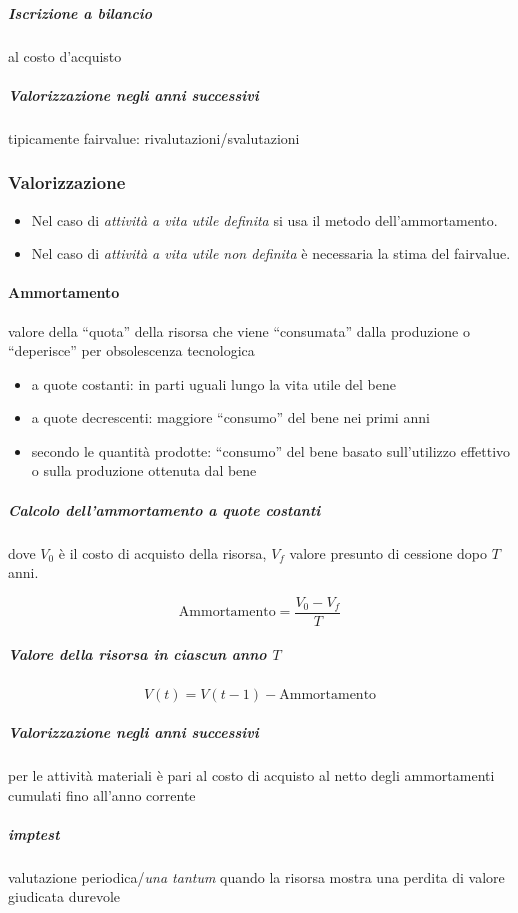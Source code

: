 \documentclass[10pt,a4paper,fleqn,oneside]{book}
\begin{document}
\subparagraph{Iscrizione a bilancio} al costo d'acquisto
\subparagraph{Valorizzazione negli anni successivi} tipicamente \gls{fairvalue}:
rivalutazioni/svalutazioni

\subsubsection{Valorizzazione}

\begin{itemize}
    \item Nel caso di \emph{attività a vita utile definita} si usa il metodo dell'ammortamento.
    \item Nel caso di \emph{attività a vita utile non definita} è necessaria la stima del \gls{fairvalue}.
\end{itemize}


\paragraph{Ammortamento} valore della ``quota'' della risorsa che viene ``consumata''
dalla produzione o “deperisce” per obsolescenza tecnologica
\begin{itemize}
    \item a quote costanti: in parti uguali lungo la vita utile del bene
    \item a quote decrescenti: maggiore ``consumo'' del bene nei primi anni
    \item secondo le quantità prodotte: ``consumo'' del bene basato sull’utilizzo
    effettivo o sulla produzione ottenuta dal bene
\end{itemize}

\subparagraph{Calcolo dell'ammortamento a quote costanti} dove $V_0$ è il costo
di acquisto della risorsa, $V_f$ valore presunto di cessione dopo $T$ anni.

\begin{equation*}
    \text{Ammortamento} = \frac{V_0 - V_f}{T}
\end{equation*}

\subparagraph{Valore della risorsa in ciascun anno $T$}
\begin{equation*}
    V(t) = V(t-1) - \text{Ammortamento}
\end{equation*}

\subparagraph{Valorizzazione negli anni successivi} per le attività materiali è pari al
costo di acquisto al netto degli ammortamenti cumulati fino all’anno corrente

\subparagraph{\Gls{imptest}} valutazione periodica/\emph{una tantum} quando la
risorsa mostra una perdita di valore giudicata durevole
\end{document}
